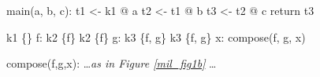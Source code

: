 \begin{minipage}{5in}%
\begin{center}%
\begin{minipage}{4in}%
\begin{AVerb}[numbers=left]
main(a, b, c): \label{mil_main_fig2}
  t1 <- k1 @ a \label{mil_t1_fig2}
  t2 <- t1 @ b \label{mil_t2_fig2}
  t3 <- t2 @ c \label{mil_t3_fig2}
  return t3

k1 \{\} f: k2 \{f\} \label{mil_k1_fig2}
k2 \{f\} g: k3 \{f, g\} \label{mil_k2_fig2}
k3 \{f, g\} x: compose(f, g, x) \label{mil_k3_fig2}

compose(f,g,x): \dots {\rm\emph{as in Figure \ref{mil_fig1b}}} \dots 
\end{AVerb}
\end{minipage}%
\end{center}%
\end{minipage}%
